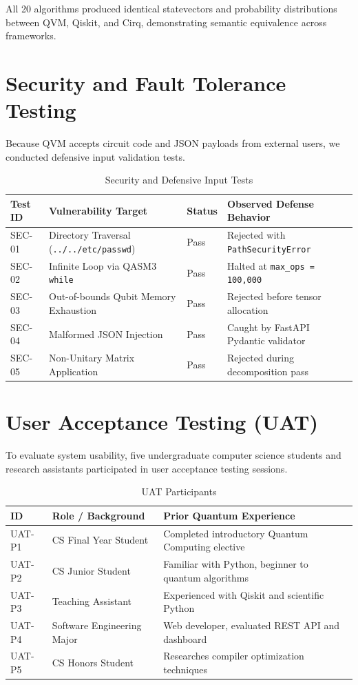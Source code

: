 All 20 algorithms produced identical statevectors and probability distributions between QVM, Qiskit, and Cirq, demonstrating semantic equivalence across frameworks.

\section{Security and Fault Tolerance Testing}
Because QVM accepts circuit code and JSON payloads from external users, we conducted defensive input validation tests.

\begin{table}[h!]
\centering
\caption{Security and Defensive Input Tests}
\label{tab:sec_tests}
\begin{tabular}{|p{2cm}|p{5cm}|p{2cm}|p{3.5cm}|}
\hline
\textbf{Test ID} & \textbf{Vulnerability Target} & \textbf{Status} & \textbf{Observed Defense Behavior} \\
\hline
SEC-01 & Directory Traversal (\texttt{../../etc/passwd}) & Pass & Rejected with \texttt{PathSecurityError} \\
\hline
SEC-02 & Infinite Loop via QASM3 \texttt{while} & Pass & Halted at \texttt{max\_ops = 100,000} \\
\hline
SEC-03 & Out-of-bounds Qubit Memory Exhaustion & Pass & Rejected before tensor allocation \\
\hline
SEC-04 & Malformed JSON Injection & Pass & Caught by FastAPI Pydantic validator \\
\hline
SEC-05 & Non-Unitary Matrix Application & Pass & Rejected during decomposition pass \\
\hline
\end{tabular}
\end{table}

\section{User Acceptance Testing (UAT)}
To evaluate system usability, five undergraduate computer science students and research assistants participated in user acceptance testing sessions.

\begin{table}[h!]
\centering
\caption{UAT Participants}
\label{tab:uat_participants}
\begin{tabular}{|p{2cm}|p{4.5cm}|p{6cm}|}
\hline
\textbf{ID} & \textbf{Role / Background} & \textbf{Prior Quantum Experience} \\
\hline
UAT-P1 & CS Final Year Student & Completed introductory Quantum Computing elective \\
\hline
UAT-P2 & CS Junior Student & Familiar with Python, beginner to quantum algorithms \\
\hline
UAT-P3 & Teaching Assistant & Experienced with Qiskit and scientific Python \\
\hline
UAT-P4 & Software Engineering Major & Web developer, evaluated REST API and dashboard \\
\hline
UAT-P5 & CS Honors Student & Researches compiler optimization techniques \\
\hline
\end{tabular}
\end{table}

